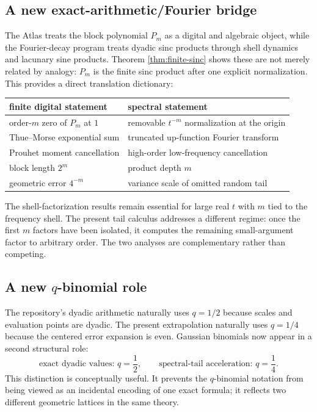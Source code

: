 \documentclass[11pt,oneside]{article}
\numberwithin{equation}{section}
\theoremstyle{definition}
\theoremstyle{remark}
\begin{document}
\subsection{A new exact-arithmetic/Fourier bridge}

The Atlas treats the block polynomial $P_m$ as a digital and algebraic object, while the
Fourier-decay program treats dyadic sinc products through shell dynamics and lacunary sine
products.  Theorem \ref{thm:finite-sinc} shows these are not merely related by analogy:
$P_m$ is the finite sinc product after one explicit normalization.  This provides a direct
translation dictionary:
\begin{center}
\small
\begin{tabular}{@{}ll@{}}
\toprule
finite digital statement & spectral statement \\
\midrule
order-$m$ zero of $P_m$ at $1$ & removable $t^{-m}$ normalization at the origin\\
Thue--Morse exponential sum & truncated up-function Fourier transform\\
Prouhet moment cancellation & high-order low-frequency cancellation\\
block length $2^m$ & product depth $m$\\
geometric error $4^{-m}$ & variance scale of omitted random tail\\
\bottomrule
\end{tabular}
\end{center}

The shell-factorization results remain essential for large real $t$ with $m$ tied to the
frequency shell.  The present tail calculus addresses a different regime: once the first
$m$ factors have been isolated, it computes the remaining small-argument factor to arbitrary
order.  The two analyses are complementary rather than competing.

\subsection{A new $q$-binomial role}

The repository's dyadic arithmetic naturally uses $q=1/2$ because scales and evaluation
points are dyadic.  The present extrapolation naturally uses $q=1/4$ because the centered
error expansion is even.  Gaussian binomials now appear in a second structural role:
\begin{equation}
 \text{exact dyadic values: }q=\frac12,
 \qquad
 \text{spectral-tail acceleration: }q=\frac14.
 \label{eq:two-q}
\end{equation}
This distinction is conceptually useful.  It prevents the $q$-binomial notation from being
viewed as an incidental encoding of one exact formula; it reflects two different geometric
lattices in the same theory.
\end{document}
